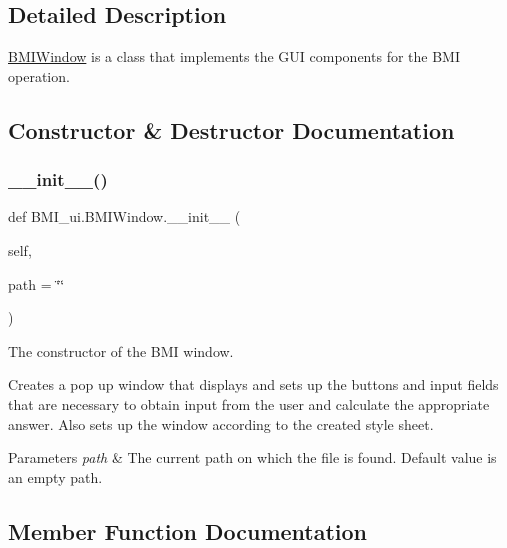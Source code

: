 \subsection{Detailed Description}
\hyperlink{class_b_m_i__ui_1_1_b_m_i_window}{B\+M\+I\+Window} is a class that implements the G\+UI components for the B\+MI operation. 

\subsection{Constructor \& Destructor Documentation}
\mbox{\label{class_b_m_i__ui_1_1_b_m_i_window_a0a248356e06771e32f78f0e7933d066f}} 
\subsubsection{\texorpdfstring{\+\_\+\+\_\+init\+\_\+\+\_\+()}{\_\_init\_\_()}}
{\footnotesize\ttfamily def B\+M\+I\+\_\+ui.\+B\+M\+I\+Window.\+\_\+\+\_\+init\+\_\+\+\_\+ (\begin{DoxyParamCaption}\item[{}]{self,  }\item[{}]{path = {\ttfamily \char`\"{}\char`\"{}} }\end{DoxyParamCaption})}



The constructor of the B\+MI window. 

Creates a pop up window that displays and sets up the buttons and input fields that are necessary to obtain input from the user and calculate the appropriate answer. Also sets up the window according to the created style sheet. 
\begin{DoxyParams}{Parameters}
{\em path} & The current path on which the file is found. Default value is an empty path. \\
\hline
\end{DoxyParams}


\subsection{Member Function Documentation}
\mbox{\label{class_b_m_i__ui_1_1_b_m_i_window_ad8708c4a841a95a31c9f9d117f4440b2}} 

